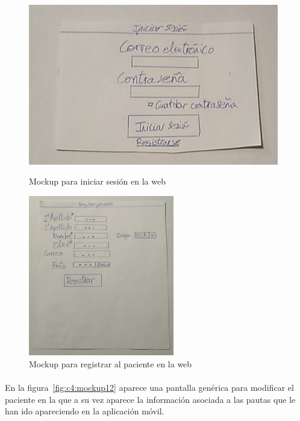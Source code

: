\begin{figure}[h]
    \centering
    \begin{minipage}{.4\textwidth}
        \centering
        \includegraphics[width=0.8\linewidth, height=7cm]{Imagenes/anxA2.jpg}
        \caption[Mockup para iniciar sesión en la web]{Mockup para iniciar sesión en la web}
        \label{fig:c4:mockup7}
    \end{minipage}
    \hfill\vline\hfill
    \begin{minipage}{.4\textwidth}
        \centering
        \includegraphics[width=0.8\linewidth, height=7cm]{Imagenes/anxA3.jpg}
        \caption[Mockup para registrar al paciente en la web]{Mockup para registrar al paciente en la web}
        \label{fig:c4:mockup8}
    \end{minipage}
\end{figure}

\paragraph{}
En la figura~\ref{fig:c4:mockup12} aparece una pantalla genérica para modificar el paciente en la que a su vez aparece la información asociada a las pautas que le han ido apareciendo en la aplicación móvil.

